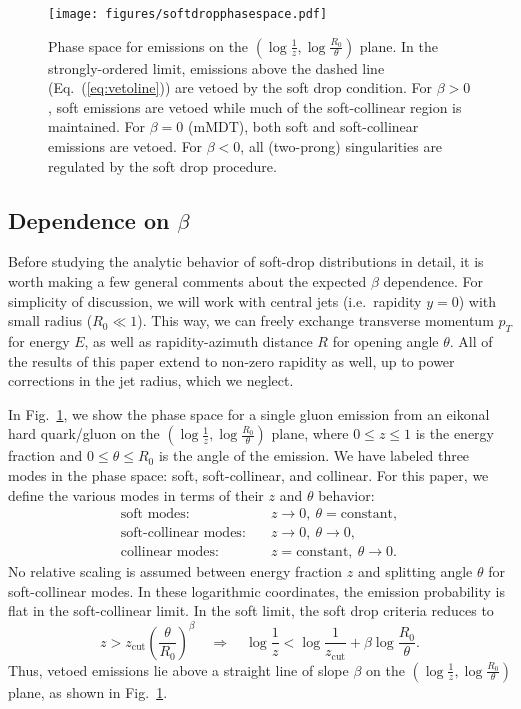 \documentclass[letterpaper,11pt]{article}
\newcommand{\zcut}{z_\text{cut}}
\DeclareRobustCommand{\Fig}[1]{Fig.~\ref{#1}}
\DeclareRobustCommand{\Eq}[1]{Eq.~(\ref{#1})}
\begin{document}
\begin{figure}
\begin{center}
\texttt{[image: figures/softdropphasespace.pdf]}
\end{center}
\caption{Phase space for emissions on the $(\log \frac{1}{z},\log \frac{R_0}{\theta})$ plane.  In the strongly-ordered limit, emissions above the dashed line (\Eq{eq:vetoline}) are vetoed by the soft drop condition.  For $\beta > 0$, soft emissions are vetoed while much of the soft-collinear region is maintained.  For $\beta = 0$ (mMDT), both soft and soft-collinear emissions are vetoed.  For $\beta < 0$, all (two-prong) singularities are regulated by the soft drop procedure.}
\label{fig:groomedregions}
\end{figure}

\subsection{Dependence on $\beta$}
\label{sec:betachange}

Before studying the analytic behavior of soft-drop distributions in detail, it is worth making a few general comments about the expected $\beta$ dependence.   For simplicity of discussion, we will work with central jets (i.e.\ rapidity $y = 0$) with small radius ($R_0 \ll 1$).  This way, we can freely exchange transverse momentum $p_T$ for energy $E$, as well as rapidity-azimuth distance $R$ for opening angle $\theta$.  All of the results of this paper extend to non-zero rapidity as well, up to power corrections in the jet radius, which we neglect.

In \Fig{fig:groomedregions}, we show the phase space for a single gluon emission from an eikonal hard quark/gluon on the $(\log \frac{1}{z},\log \frac{R_0}{\theta})$ plane, where $0 \le z \le 1$ is the energy fraction and $0 \le \theta \le R_0$ is the angle of the emission. We have labeled three modes in the phase space: soft, soft-collinear, and collinear.  For this paper, we define the various modes in terms of their $z$ and $\theta$ behavior: 
\begin{align*}
\text{soft modes:} &\quad z\to 0,\ \theta = \text{constant}, \\
\text{soft-collinear modes:}  &\quad z\to 0,\ \theta \to 0, \\
\text{collinear modes:}  &\quad z=\text{constant},\ \theta \to 0. 
\end{align*}
No relative scaling is assumed between energy fraction $z$ and splitting angle $\theta$ for soft-collinear modes. 
In these logarithmic coordinates, the emission probability is flat in the soft-collinear limit.  In the soft limit, the soft drop criteria reduces to
\begin{equation}
\label{eq:vetoline}
z > \zcut \left(\frac{\theta}{R_0}\right)^\beta \quad \Rightarrow \quad \log \frac{1}{z} < \log \frac{1}{\zcut} + \beta \log \frac{R_0}{\theta}.
\end{equation}
Thus, vetoed emissions lie above a straight line of slope $\beta$ on the $(\log \frac{1}{z},\log \frac{R_0}{\theta})$ plane, as shown in \Fig{fig:groomedregions}.
\end{document}

